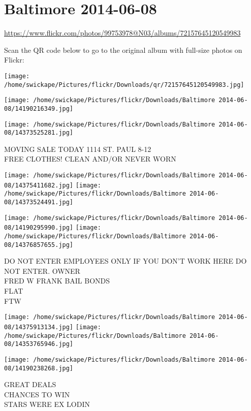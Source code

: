 \documentclass[10pt,letterpaper]{article}
\title{}
\author{}
\date{}
\begin{document}
\section*{Baltimore 2014-06-08}

\url{https://www.flickr.com/photos/99753978@N03/albums/72157645120549983}

Scan the QR code below to go to the original album with full-size photos on Flickr:

\texttt{[image: /home/swickape/Pictures/flickr/Downloads/qr/72157645120549983.jpg]}
\pagebreak

\texttt{[image: /home/swickape/Pictures/flickr/Downloads/Baltimore 2014-06-08/14190216349.jpg]}

\vspace{0.25in}
\texttt{[image: /home/swickape/Pictures/flickr/Downloads/Baltimore 2014-06-08/14373525281.jpg]}

MOVING SALE TODAY 1114 ST. PAUL 8{-}12\\
FREE CLOTHES! CLEAN AND/OR NEVER WORN
\pagebreak

\texttt{[image: /home/swickape/Pictures/flickr/Downloads/Baltimore 2014-06-08/14375411682.jpg]}
\texttt{[image: /home/swickape/Pictures/flickr/Downloads/Baltimore 2014-06-08/14373524491.jpg]}

\texttt{[image: /home/swickape/Pictures/flickr/Downloads/Baltimore 2014-06-08/14190295990.jpg]}
\texttt{[image: /home/swickape/Pictures/flickr/Downloads/Baltimore 2014-06-08/14376857655.jpg]}

DO NOT ENTER EMPLOYEES ONLY IF YOU DON'T WORK HERE DO NOT ENTER.  OWNER\\
FRED W FRANK BAIL BONDS\\
FLAT\\
FTW
\pagebreak

\texttt{[image: /home/swickape/Pictures/flickr/Downloads/Baltimore 2014-06-08/14375913134.jpg]}
\texttt{[image: /home/swickape/Pictures/flickr/Downloads/Baltimore 2014-06-08/14353765946.jpg]}

\vspace{0.25in}
\texttt{[image: /home/swickape/Pictures/flickr/Downloads/Baltimore 2014-06-08/14190238268.jpg]}

GREAT DEALS\\
CHANCES TO WIN\\
STARS WERE EX LODIN
\pagebreak
\end{document}
